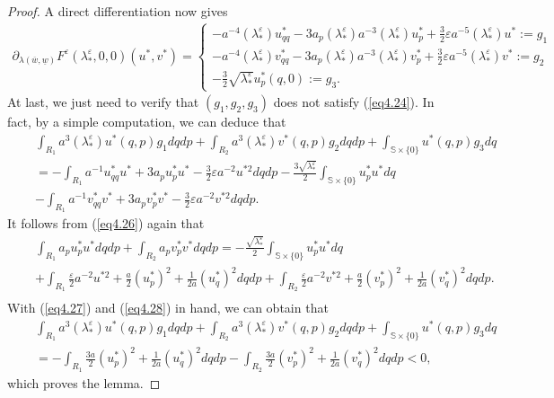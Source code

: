 \documentclass[11pt,reqno]{amsart}
\numberwithin{equation}{section}
\theoremstyle{definition}
\theoremstyle{remark}
\begin{document}
\begin{proof}
A direct differentiation now gives
\begin{eqnarray}
\partial_{\lambda(\overline{w},\underline{w})}F^{\varepsilon}(\lambda_*^{\varepsilon}, 0, 0)(u^*,v^*)=\left\{\begin{array}{llll}
{-a^{-4}(\lambda_*^{\varepsilon})u^*_{qq}-3a_p(\lambda_*^{\varepsilon})a^{-3}(\lambda_*^{\varepsilon})u^*_p+\frac{3}{2}\varepsilon a^{-5}(\lambda_*^{\varepsilon})u^*:=g_1} \\
{-a^{-4}(\lambda_*^{\varepsilon})v^*_{qq}-3a_p(\lambda_*^{\varepsilon})a^{-3}(\lambda_*^{\varepsilon})v^*_p+\frac{3}{2}\varepsilon a^{-5}(\lambda_*^{\varepsilon})v^*:=g_2} \\
{-\frac{3}{2}\sqrt{\lambda_*^{\varepsilon}}u^*_p(q,0):=g_3}.\end{array}\right.
\nonumber
\end{eqnarray}
At last, we just need to verify that $(g_1,g_2,g_3)$ does not
satisfy (\ref{eq4.24}). In fact, by a simple computation, we can
deduce that
\begin{eqnarray}
&~&\int_{R_1}a^3(\lambda_*^{\varepsilon})u^*(q,p)g_1 dqdp+\int_{R_2}a^3(\lambda_*^{\varepsilon})v^*(q,p)g_2 dqdp+\int_{\mathbb{S}\times\{0\}}u^*(q,p) g_3 dq\nonumber\\
&~&= -\int_{R_1}a^{-1}u^*_{qq}u^*+3a_pu^*_pu^* -\frac{3}{2}\varepsilon a^{-2}u^{*2} dqdp-\frac{3\sqrt{\lambda_*^{\varepsilon}}}{2}\int_{\mathbb{S}\times\{0\}}u^*_pu^* dq\nonumber\\
&~&-\int_{R_1}a^{-1}v^*_{qq}v^*+3a_pv^*_pv^* -\frac{3}{2}\varepsilon
a^{-2}v^{*2} dqdp.  \label{eq4.27}
\end{eqnarray}
It follows from (\ref{eq4.26}) again that
\begin{eqnarray}
&~&\int_{R_1}a_pu^*_pu^* dqdp+\int_{R_2}a_pv^*_pv^* dqdp=-\frac{\sqrt{\lambda_*^{\varepsilon}}}{2}\int_{\mathbb{S}\times\{0\}}u^*_pu^* dq\nonumber\\
&~&+\int_{R_1}\frac{\varepsilon}{2}a^{-2}u^{*2}+\frac{a}{2}(u^*_p)^2
+\frac{1}{2a}(u^*_q)^2 dqdp+
\int_{R_2}\frac{\varepsilon}{2}a^{-2}v^{*2}+\frac{a}{2}(v^*_p)^2
+\frac{1}{2a}(v^*_q)^2 dqdp . \nonumber\\ \label{eq4.28}
\end{eqnarray}
With (\ref{eq4.27}) and (\ref{eq4.28}) in hand, we can obtain that
\begin{eqnarray}
&~&\int_{R_1}a^3(\lambda_*^{\varepsilon})u^*(q,p)g_1 dqdp+\int_{R_2}a^3(\lambda_*^{\varepsilon})v^*(q,p)g_2 dqdp+\int_{\mathbb{S}\times\{0\}}u^*(q,p) g_3 dq\nonumber\\
&~&=-\int_{R_1}\frac{3a}{2}(u^*_p)^2 +\frac{1}{2a}(u^*_q)^2
dqdp-\int_{R_2}\frac{3a}{2}(v^*_p)^2 +\frac{1}{2a}(v^*_q)^2
dqdp<0,\nonumber
\end{eqnarray}
which proves the lemma.
\end{proof}
\end{document}
